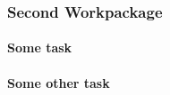 \subsubsection{Second Workpackage}
\label{wp:2}


\lipsum[1]

\paragraph{Some task }
\label{sec:some-task}
\lipsum[1]

\paragraph{Some other task }
\label{sec:some-other-task}
\lipsum[1]





